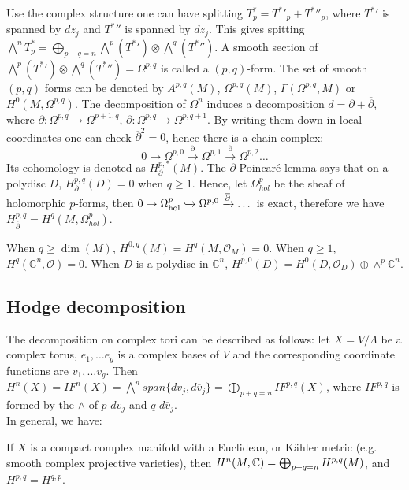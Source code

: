 Use the complex structure one can have splitting $T^*_p={T^*}'_p+{T^*}{''}_p$, where ${T^*}'$ is spanned by $dz_j$ and ${T^*}{''}$ is spanned by $\overline{dz_j}$. This gives spitting $\bigwedge^nT^*_p=\bigoplus_{p+q=n}\bigwedge^p({T^*}')\otimes \bigwedge^q({T^*}{''})$. A smooth section of $\bigwedge^p({T^*}')\otimes \bigwedge^q({T^*}{''})=\Omega^{p,q}$ is called a $(p,q)$-form. The set of smooth $(p,q)$ forms can be denoted by $A^{p,q}(M)$, $\Omega^{p,q}(M)$, $\Gamma(\Omega^{p,q},M)$ or $H^0(M,\Omega^{p,q})$. The decomposition of $\Omega^n$ induces a decomposition $d=\partial+\overline{\partial}$, where $\partial: \Omega^{p,q}\rightarrow\Omega^{p+1,q}$, $\overline{\partial}:\Omega^{p,q}\rightarrow\Omega^{p,q+1}$. By writing them down in local coordinates one can check $\overline{\partial}^2=0$, hence there is a chain complex:
$$0\rightarrow\Omega^{p,0}\xrightarrow{\partial}\Omega^{p,1}\xrightarrow{\partial}\Omega^{p,2}\dots$$
Its cohomology is denoted as $H^{p,*}_\partial(M)$. 
The $\overline{\partial}$-Poincar\'e lemma says that on a polydisc $D$, $H^{p,q}_\partial(D)=0$ when $q\geq 1$. Hence, let $\Omega^p_{hol}$ be the sheaf of holomorphic $p$-forms, then $0 \rightarrow\Omega^p_{\rm hol} \xhookrightarrow{}\Omega^{p,0} \xrightarrow{\overline{\partial}}\dots$ is exact, therefore we have $H^{p,q}_{\overline{\partial}}=H^q(M,\Omega^p_{hol})$. \\

\begin{example}
When $q\geq\dim(M)$, $H^{0,q}(M)=H^q(M,\mathcal{O}_M)=0$. When $q\geq 1$, $H^q(\mathbb{C}^n,\mathcal{O})=0$. When $D$ is a polydisc in $\mathbb{C}^n$, $H^{p,0}(D)=H^0(D,\mathcal{O}_D)\oplus\wedge^p\mathbb{C}^n$. 	
\end{example}

\subsection{Hodge decomposition}
The decomposition on complex tori can be described as follows: let $X=V/\Lambda$ be a complex torus, $e_1,\dots e_g$ is a complex bases of $V$ and the corresponding coordinate functions are $v_1,\dots v_g$. Then $H^n(X)=IF^n(X)=\bigwedge^n span\{dv_j,d\overline{v}_j\}=\bigoplus_{p+q=n}IF^{p,q}(X)$, where $IF^{p,q}$ is formed by the $\wedge$ of $p$ $dv_j$ and $q$ $d\overline{v}_j$.\\
 
In general, we have: 
\begin{theorem}
	If $X$ is a compact complex manifold with a Euclidean, or K\"ahler metric (e.g. smooth complex projective varieties), then $H^n(M , {\mathbb C})=\bigoplus_{p+q=n}H^{p,q}(M)$, and $H^{p,q}=\overline{H^{q,p}}$.
\end{theorem}

	 